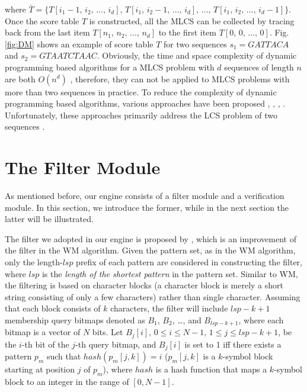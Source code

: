 \documentclass{article}
\begin{document}
where
$\bar{T} = \{T[i_1-1,\, i_2,\, ...,\, i_d],\, T[i_1,\, i_2-1,\, ...,\,
i_d],\, ...,\, T[i_1,\, i_2,\, ...,\, i_d-1]\}$. Once the score table
$T$ is constructed, all the MLCS can be collected by tracing back from
the last item $T[n_1,\, n_2,\, ...,\, n_d]$ to the first item
$T[0,\, 0,\, ...,\, 0]$. Fig. \ref{fig:DM} shows an example of score
table $T$ for two sequences $s_1 = GATTACA$ and $s_2 = GTAATCTAAC$.
Obviously, the time and space complexity of dynamic programming based
algorithms for a MLCS problem with $d$ sequences of length $n$ are
both $O(n^d)$ \cite{Hsu1984}, therefore, they can not be applied to
MLCS problems with more than two sequences in practice. To reduce the
complexity of dynamic programming based algorithms, various approaches
have been proposed \cite{Hirschberg1977}, \cite{Apostolico1992},
\cite{Masek1980}, \cite{Rick1994}. Unfortunately, these approaches
primarily address the LCS problem of two sequences .

\section{The Filter Module}
\label{sec:filter}

As mentioned before, our engine consists of a filter module and a
verification module. In this section, we introduce the former, while
in the next section the latter will be illustrated.

The filter we adopted in our engine is proposed by \cite{Lee2013},
which is an improvement of the filter in the WM algorithm. Given the
pattern set, as in the WM algorithm, only the length-$lsp$ prefix of
each pattern are considered in constructing the filter, where $lsp$ is
the \emph{length of the shortest pattern} in the pattern set. Similar
to WM, the filtering is based on character blocks (a character block
is merely a short string consisting of only a few characters) rather
than single character. Assuming that each block consists of $k$
characters, the filter will include $lsp-k+1$ membership query bitmaps
denoted as $B_1$, $B_2$, \dots, and $B_{lsp-k+1}$, where each bitmap
is a vector of $N$ bits. Let $B_j[i]$, $0 \leq i \leq N - 1$,
$1 \leq j \leq lsp-k+1$, be the $i$-th bit of the $j$-th query bitmap,
and $B_j[i]$ is set to 1 iff there exists a pattern $p_m$ such that
$hash(p_m[j,k]) = i$ ($p_m[j,k]$ is a $k$-symbol block starting at
position $j$ of $p_m$), where $hash$ is a hash function that maps a
$k$-symbol block to an integer in the range of $[0, N-1]$.

\end{document}
